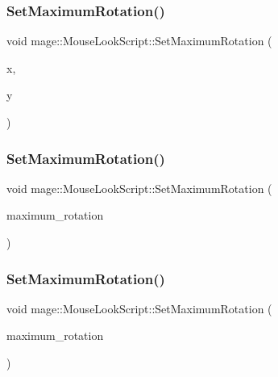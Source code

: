 \hypertarget{classmage_1_1_mouse_look_script_a2e9d5982a1d650af143b06ed1d8ccde2}{}\label{classmage_1_1_mouse_look_script_a2e9d5982a1d650af143b06ed1d8ccde2} 
\subsubsection{\texorpdfstring{Set\+Maximum\+Rotation()}{SetMaximumRotation()}\hspace{0.1cm}{\footnotesize\ttfamily [1/3]}}
{\footnotesize\ttfamily void mage\+::\+Mouse\+Look\+Script\+::\+Set\+Maximum\+Rotation (\begin{DoxyParamCaption}\item[{float}]{x,  }\item[{float}]{y }\end{DoxyParamCaption})}

\hypertarget{classmage_1_1_mouse_look_script_a551e76e245258b879f229e4e86a91650}{}\label{classmage_1_1_mouse_look_script_a551e76e245258b879f229e4e86a91650} 
\subsubsection{\texorpdfstring{Set\+Maximum\+Rotation()}{SetMaximumRotation()}\hspace{0.1cm}{\footnotesize\ttfamily [2/3]}}
{\footnotesize\ttfamily void mage\+::\+Mouse\+Look\+Script\+::\+Set\+Maximum\+Rotation (\begin{DoxyParamCaption}\item[{const X\+M\+F\+L\+O\+A\+T2 \&}]{maximum\+\_\+rotation }\end{DoxyParamCaption})}

\hypertarget{classmage_1_1_mouse_look_script_a1ada4478723b4270dfcb644f4c1b8dc7}{}\label{classmage_1_1_mouse_look_script_a1ada4478723b4270dfcb644f4c1b8dc7} 
\subsubsection{\texorpdfstring{Set\+Maximum\+Rotation()}{SetMaximumRotation()}\hspace{0.1cm}{\footnotesize\ttfamily [3/3]}}
{\footnotesize\ttfamily void mage\+::\+Mouse\+Look\+Script\+::\+Set\+Maximum\+Rotation (\begin{DoxyParamCaption}\item[{const X\+M\+V\+E\+C\+T\+OR \&}]{maximum\+\_\+rotation }\end{DoxyParamCaption})}

